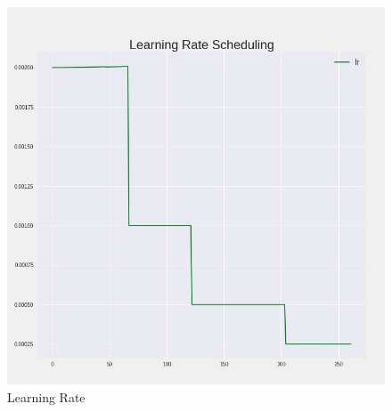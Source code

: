 \documentclass[
12pt,
tightenlines,
aps,
prb,
twocolumn,
superscriptaddress,
longbibliography,
floatfix
]{revtex4-2}
\begin{document}
\begin{figure}[h]
    \includegraphics[clip=true,width=\columnwidth, height=\columnwidth]{LFWfinal_lr.jpeg}
    \caption{Learning Rate} 
     \label{fig:lr}
\end{figure}
\end{document}
